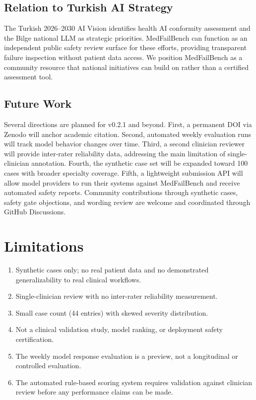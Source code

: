 \documentclass[11pt,a4paper]{article}
\begin{document}
\subsection{Relation to Turkish AI Strategy}

The Turkish 2026--2030 AI Vision identifies health AI conformity assessment
and the Bilge national LLM as strategic priorities. MedFailBench can function
as an independent public safety review surface for these efforts, providing
transparent failure inspection without patient data access. We position
MedFailBench as a community resource that national initiatives can build on
rather than a certified assessment tool.

\subsection{Future Work}

Several directions are planned for v0.2.1 and beyond. First, a permanent DOI
via Zenodo will anchor academic citation. Second, automated weekly evaluation
runs will track model behavior changes over time. Third, a second clinician
reviewer will provide inter-rater reliability data, addressing the main
limitation of single-clinician annotation. Fourth, the synthetic case set
will be expanded toward 100 cases with broader specialty coverage. Fifth,
a lightweight submission API will allow model providers to run their systems
against MedFailBench and receive automated safety reports. Community
contributions through synthetic cases, safety gate objections, and wording
review are welcome and coordinated through GitHub Discussions.

\section{Limitations}

\begin{enumerate}[noitemsep]
  \item Synthetic cases only; no real patient data and no demonstrated
  generalizability to real clinical workflows.
  \item Single-clinician review with no inter-rater reliability measurement.
  \item Small case count (44 entries) with skewed severity distribution.
  \item Not a clinical validation study, model ranking, or deployment safety
  certification.
  \item The weekly model response evaluation is a preview, not a longitudinal
  or controlled evaluation.
  \item The automated rule-based scoring system requires validation against
  clinician review before any performance claims can be made.
\end{enumerate}
\end{document}
